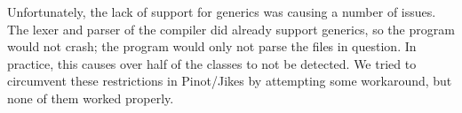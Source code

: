 \begin{itemize}
    Unfortunately, the lack of support for generics was causing a number of issues. The lexer and parser of the compiler did already support generics, so the program would not crash; the program would only not parse the files in question. In practice, this causes over half of the classes to not be detected. We tried to circumvent these restrictions in Pinot/Jikes by attempting some workaround, but none of them worked properly.
\end{itemize}
